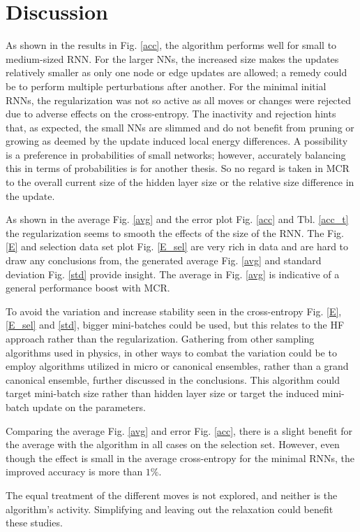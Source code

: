 \chapter{Discussion}

As shown in the results in Fig. \ref{acc}, the algorithm performs well for small to medium-sized RNN. For the larger NNs, the increased size makes the updates relatively smaller as only one node or edge updates are allowed; a remedy could be to perform multiple perturbations after another. For the minimal initial RNNs, the regularization was not so active as all moves or changes were rejected due to adverse effects on the cross-entropy. The inactivity and rejection hints that, as expected, the small NNs are slimmed and do not benefit from pruning or growing as deemed by the update induced local energy differences. A possibility is a preference in probabilities of small networks; however, accurately balancing this in terms of probabilities is for another thesis. So no regard is taken in MCR to the overall current size of the hidden layer size or the relative size difference in the update.

As shown in the average Fig. \ref{avg} and the error plot Fig. \ref{acc} and Tbl. \ref{acc_t} the regularization seems to smooth the effects of the size of the RNN. The Fig. \ref{E} and selection data set plot Fig. \ref{E_sel} are very rich in data and are hard to draw any conclusions from, the generated average Fig. \ref{avg} and standard deviation Fig. \ref{std} provide insight. The average in Fig. \ref{avg} is indicative of a general performance boost with MCR.

To avoid the variation and increase stability seen in the cross-entropy Fig. \ref{E}, \ref{E_sel} and \ref{std}, bigger mini-batches could be used, but this relates to the HF approach rather than the regularization. Gathering from other sampling algorithms used in physics, in other ways to combat the variation could be to employ algorithms utilized in micro or canonical ensembles, rather than a grand canonical ensemble, further discussed in the conclusions. This algorithm could target mini-batch size rather than hidden layer size or target the induced mini-batch update on the parameters.

Comparing the average Fig. \ref{avg} and error Fig. \ref{acc}, there is a slight benefit for the average with the algorithm in all cases on the selection set. However, even though the effect is small in the average cross-entropy for the minimal RNNs, the improved accuracy is more than $1\%$.

The equal treatment of the different moves is not explored, and neither is the algorithm's activity. Simplifying and leaving out the relaxation could benefit these studies. 

